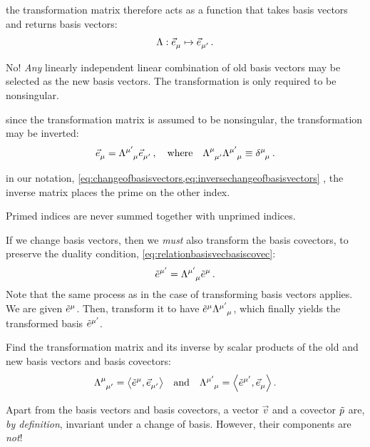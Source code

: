  the transformation matrix therefore acts as a function that takes basis vectors and returns basis vectors:
%
\begin{equation*}
  \fdmap{\transmat}{\tbvec\mu}{\tbvec{\aidx\mu}}\,.
\end{equation*}

 No! \emph{Any} linearly independent linear combination of old basis vectors may be selected as the new basis vectors. The transformation is only required to be nonsingular.

 since the transformation matrix is assumed to be nonsingular, the transformation may be inverted:
%
\begin{equation}\label{eq:inversechangeofbasisvectors}
  \tbvec\mu = \ttransmat{\aidx\mu}{\mu}\tbvec{\aidx\mu}\,,\quad\text{where}\quad
  \ttransmat{\mu}{\aidx\mu}\ttransmat{\aidx\mu}{\mu} \defas\tkron\mu\mu\,.
\end{equation}

 in our notation, \cref{eq:changeofbasisvectors,eq:inversechangeofbasisvectors} , the inverse matrix places the prime on the other index.

 Primed indices are never summed together with unprimed indices.

 If we change basis vectors, then we \emph{must} also transform the basis covectors, to preserve the duality condition, \cref{eq:relationbasisvecbasiscovec}:
%
\begin{equation}\label{eq:transformationofdualbasis}
  \tbcov{\aidx\mu} = \ttransmat{\aidx\mu}{\mu}\tbcov\mu\,.
\end{equation}
%
Note that the same process as in the case of transforming basis vectors applies. We are given $\tbcov\mu$. Then, transform it to have $\tbcov\mu\ttransmat{\aidx\mu}{\mu}$, which finally yields the transformed basis $\tbcov{\aidx\mu}$.

 Find the transformation matrix and its inverse by scalar products of the old and new basis vectors and basis covectors:
%
\begin{equation}\label{eq:transformationmatrixfromscalarproducts}
  \ttransmat\mu{\aidx\mu} = \sprod{\tbcov\mu}{\tbvec{\aidx\mu}}\quad\text{and}\quad
  \ttransmat{\aidx\mu}\mu = \sprod{\tbcov{\aidx\mu}}{\tbvec\mu}\,.
\end{equation}

 Apart from the basis vectors and basis covectors, a vector $\vec v$ and a covector $\tilde{p}$ are, \emph{by definition}, invariant under a change of basis. However, their components are \emph{not}! 

